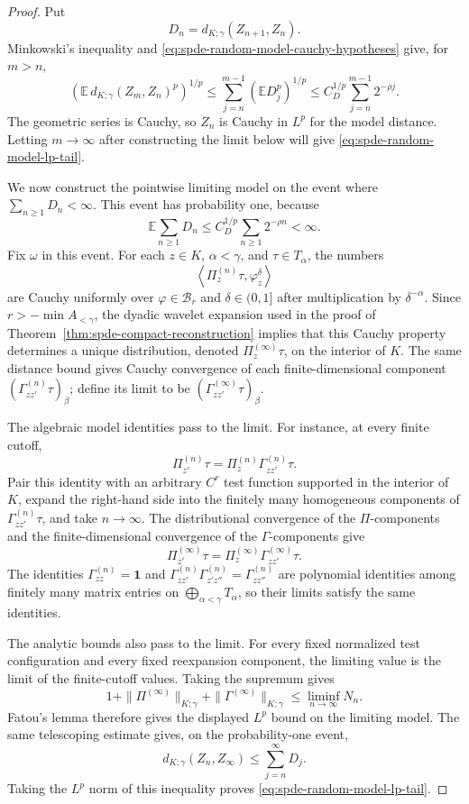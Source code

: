 \begin{proof}
Put
\[
  D_n=d_{K;\gamma}(Z_{n+1},Z_n).
\]
Minkowski's inequality and
\eqref{eq:spde-random-model-cauchy-hypotheses} give, for \(m>n\),
\[
  \left(
    \mathbb E\,d_{K;\gamma}(Z_m,Z_n)^p
  \right)^{1/p}
  \leq
  \sum_{j=n}^{m-1}(\mathbb E D_j^p)^{1/p}
  \leq
  C_D^{1/p}\sum_{j=n}^{m-1}2^{-\rho j}.
\]
The geometric series is Cauchy, so \(Z_n\) is Cauchy in \(L^p\) for the
model distance.  Letting \(m\to\infty\) after constructing the limit below
will give \eqref{eq:spde-random-model-lp-tail}.

We now construct the pointwise limiting model on the event where
\(\sum_{n\geq1}D_n<\infty\).  This event has probability one, because
\[
  \mathbb E\sum_{n\geq1}D_n
  \leq
  C_D^{1/p}\sum_{n\geq1}2^{-\rho n}<\infty .
\]
Fix \(\omega\) in this event.  For each \(z\in K\),
\(\alpha<\gamma\), and \(\tau\in T_\alpha\), the numbers
\[
  \left\langle
    \Pi_z^{(n)}\tau,\varphi_z^\delta
  \right\rangle
\]
are Cauchy uniformly over \(\varphi\in\mathcal B_r\) and
\(\delta\in(0,1]\) after multiplication by \(\delta^{-\alpha}\).  Since
\(r>-\min A_{<\gamma}\), the dyadic wavelet expansion used in the proof of
Theorem~\ref{thm:spde-compact-reconstruction} implies that this Cauchy
property determines a unique distribution, denoted
\(\Pi_z^{(\infty)}\tau\), on the interior of \(K\).  The same distance
bound gives Cauchy convergence of each finite-dimensional component
\((\Gamma_{zz'}^{(n)}\tau)_\beta\); define its limit to be
\((\Gamma_{zz'}^{(\infty)}\tau)_\beta\).

The algebraic model identities pass to the limit.  For instance, at every
finite cutoff,
\[
  \Pi_{z'}^{(n)}\tau
  =
  \Pi_z^{(n)}\Gamma_{zz'}^{(n)}\tau .
\]
Pair this identity with an arbitrary \(C^r\) test function supported in the
interior of \(K\), expand the right-hand side into the finitely many
homogeneous components of \(\Gamma_{zz'}^{(n)}\tau\), and take
\(n\to\infty\).  The distributional convergence of the \(\Pi\)-components
and the finite-dimensional convergence of the \(\Gamma\)-components give
\[
  \Pi_{z'}^{(\infty)}\tau
  =
  \Pi_z^{(\infty)}\Gamma_{zz'}^{(\infty)}\tau .
\]
The identities
\(\Gamma_{zz}^{(n)}=\mathbf 1\) and
\(\Gamma_{zz'}^{(n)}\Gamma_{z'z''}^{(n)}=\Gamma_{zz''}^{(n)}\) are
polynomial identities among finitely many matrix entries on
\(\bigoplus_{\alpha<\gamma}T_\alpha\), so their limits satisfy the same
identities.

The analytic bounds also pass to the limit.  For every fixed normalized test
configuration and every fixed reexpansion component, the limiting value is
the limit of the finite-cutoff values.  Taking the supremum gives
\[
  1+\|\Pi^{(\infty)}\|_{K;\gamma}
   +\|\Gamma^{(\infty)}\|_{K;\gamma}
  \leq
  \liminf_{n\to\infty} N_n .
\]
Fatou's lemma therefore gives the displayed \(L^p\) bound on the limiting
model.  The same telescoping estimate gives, on the probability-one event,
\[
  d_{K;\gamma}(Z_n,Z_\infty)
  \leq
  \sum_{j=n}^{\infty}D_j .
\]
Taking the \(L^p\) norm of this inequality proves
\eqref{eq:spde-random-model-lp-tail}.


\end{proof}
